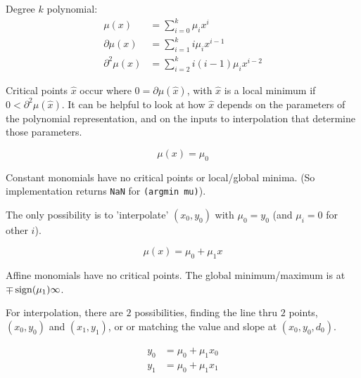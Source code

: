 
Degree $k$ polynomial:
\begin{align}
\mu(x) & = \sum_{i=0}^{k} \mu_i x^i
\\
\partial{\mu}(x) & = \sum_{i=1}^{k} i \mu_i x^{i-1}
\nonumber
\\
\partial^2{\mu}(x) & = \sum_{i=2}^{k} i (i-1) \mu_i x^{i-2}
\nonumber
\end{align}

Critical points $\hat{x}$ occur where 
$ 0 = \partial{\mu}(\hat{x}) $,
with $\hat{x}$ is a local minimum if 
$ 0 < \partial^2{\mu}(\hat{x}) $.
It can be helpful to look at how $\hat{x}$ depends
on the parameters of the polynomial representation,
and on the inputs to interpolation that determine those 
parameters.


\begin{equation}
\mu(x) = \mu_0
\end{equation}

Constant monomials have no critical points or local/global
minima. 
(So implementation returns \texttt{NaN} for \texttt{(argmin mu)}).

The only possibility is to 'interpolate' $(x_0,y_0)$ with
$\mu_0 = y_0$ (and $\mu_i = 0$ for other $i$). 


\begin{equation}
\mu(x) = \mu_0 + \mu_1 x
\end{equation}

Affine monomials have no critical points.
The global minimum/maximum is at $\mp \operatorname*{sign}(\mu_1) \infty$.

For interpolation, there are $2$ possibilities, finding the line thru $2$
points, $(x_0,y_0)$ and $(x_1,y_1)$, or or matching the value and slope at
$(x_0,y_0,d_0)$.


\begin{align}
  y_0 & = \mu_0+\mu_1 x_0  \\
   y_1 & = \mu_0+\mu_1 x_1  
\end{align}


